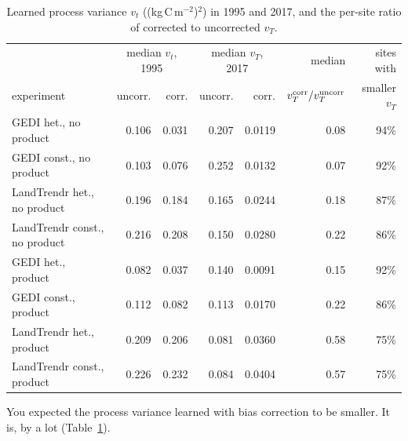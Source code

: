 \documentclass[11pt]{article}
\begin{document}
\begin{table}[ht]
  \centering\small
  \begin{tabular}{lrrrrrr}
    \toprule
    & \multicolumn{2}{c}{median $v_t$, 1995} & \multicolumn{2}{c}{median $v_T$, 2017} & median & sites with \\
    experiment & uncorr. & corr. & uncorr. & corr. & $v_T^{\rm corr}/v_T^{\rm uncorr}$ & smaller $v_T$ \\
    \midrule
    GEDI het., no product        & 0.106 & 0.031 & 0.207  & 0.0119  & 0.08 & 94\% \\
    GEDI const., no product      & 0.103 & 0.076 & 0.252  & 0.0132  & 0.07 & 92\% \\
    LandTrendr het., no product  & 0.196 & 0.184 & 0.165  & 0.0244  & 0.18 & 87\% \\
    LandTrendr const., no product& 0.216 & 0.208 & 0.150  & 0.0280  & 0.22 & 86\% \\
    GEDI het., product           & 0.082 & 0.037 & 0.140  & 0.0091  & 0.15 & 92\% \\
    GEDI const., product         & 0.112 & 0.082 & 0.113  & 0.0170  & 0.22 & 86\% \\
    LandTrendr het., product     & 0.209 & 0.206 & 0.081  & 0.0360  & 0.58 & 75\% \\
    LandTrendr const., product   & 0.226 & 0.232 & 0.084  & 0.0404  & 0.57 & 75\% \\
    \bottomrule
  \end{tabular}
  \caption{Learned process variance $v_t$ ((kg\,C\,m$^{-2}$)$^2$) in 1995 and 2017, and the
  per-site ratio of corrected to uncorrected $v_T$.}
  \label{tab:procvar}
\end{table}

You expected the process variance learned with bias correction to be smaller. It is, by a lot
(Table~\ref{tab:procvar}).
\end{document}
